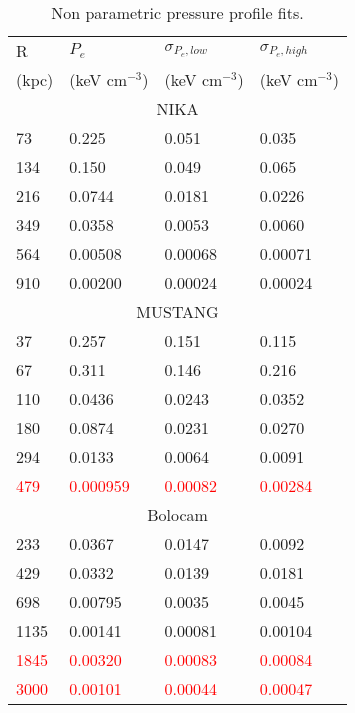 \begin{table}  %
  \caption{\footnotesize{Non parametric pressure profile fits.}}
  \begin{center}
    \begin{tabular}{|l|lll|}
      \hline
      R     & $P_e$          & $\sigma_{P_e,low}$ & $\sigma_{P_e,high}$ \\
      (kpc) & (keV cm$^{-3}$) & (keV cm$^{-3}$)   & (keV cm$^{-3}$)   \\
      \hline
      \multicolumn{4}{|c|}{NIKA} \\
      \hline
      73    & 0.225   & 0.051   & 0.035   \\
      134   & 0.150   & 0.049   & 0.065   \\
      216   & 0.0744  & 0.0181  & 0.0226  \\
      349   & 0.0358  & 0.0053  & 0.0060  \\
      564   & 0.00508 & 0.00068 & 0.00071 \\
      910   & 0.00200 & 0.00024 & 0.00024 \\
      \hline
      \multicolumn{4}{|c|}{MUSTANG} \\
      \hline
      37   & 0.257    & 0.151   & 0.115   \\
      67   & 0.311    & 0.146   & 0.216   \\
      110  & 0.0436   & 0.0243  & 0.0352  \\
      180  & 0.0874   & 0.0231  & 0.0270  \\
      294  & 0.0133   & 0.0064  & 0.0091  \\
      \textcolor{red}{479}  & \textcolor{red}{0.000959} &
      \textcolor{red}{0.00082} & \textcolor{red}{0.00284} \\
      \hline
      \multicolumn{4}{|c|}{Bolocam} \\
      \hline
      233  & 0.0367   & 0.0147   & 0.0092  \\
      429  & 0.0332   & 0.0139   & 0.0181  \\
      698  & 0.00795  & 0.0035   & 0.0045  \\
      1135 & 0.00141  & 0.00081  & 0.00104 \\
      \textcolor{red}{1845} & \textcolor{red}{0.00320}  &
      \textcolor{red}{0.00083}  & \textcolor{red}{0.00084} \\
      \textcolor{red}{3000} & \textcolor{red}{0.00101}  &
      \textcolor{red}{0.00044}  & \textcolor{red}{0.00047} \\
      \hline
    \end{tabular}
  \end{center}
  \label{tbl:nppp_res}
\end{table}

